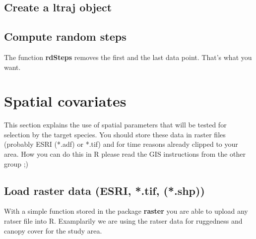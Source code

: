 \documentclass[11pt, a4paper]{article} %
\begin{document}
\subsection{Create a ltraj object}%
 

\subsection{Compute random steps}

The function \textbf{rdSteps} removes the first and the last data point. That's what you want. 

\section{Spatial covariates}%
This section explains the use of spatial parameters that will be tested for selection by the target species. You should store these data in raster files (probably ESRI (*.adf) or *.tif) and for time reasons already clipped to your area. How you can do this in R please read the GIS instructions from the other group ;)   

\subsection{Load raster data (ESRI, *.tif, (*.shp))}%
With a simple function stored in the package \textbf{raster} you are able to upload any ratser file into R. Examplarily we are using the ratser data for ruggedness and canopy cover for the study area.  
\end{document}
